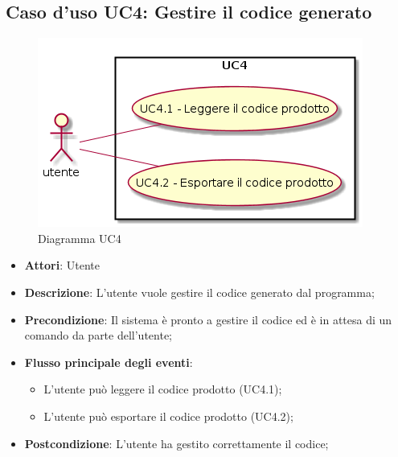 \documentclass[../AnalisiDeiRequisiti.tex]{subfiles}
\begin{document}

					\subsection{Caso d'uso UC4: Gestire il codice generato}
					\begin{figure} [H]
						\centering
						\includegraphics[scale=0.45]{./Figures/UC4.png}
						\caption{Diagramma UC4}\label{}
					\end{figure}
					\begin{itemize}
						\item \textbf{Attori}: Utente
						\item \textbf{Descrizione}: L'utente vuole gestire il codice generato dal programma;
						\item \textbf{Precondizione}: Il sistema è pronto a gestire il codice ed è in attesa di un comando da parte dell'utente;
						\item \textbf{Flusso principale degli eventi}: \begin{itemize}
							\item L'utente può leggere il codice prodotto (UC4.1);
							\item L'utente può esportare il codice prodotto (UC4.2);
						\end{itemize}
						\item \textbf{Postcondizione}: L'utente ha gestito correttamente il codice;
					\end{itemize}
\end{document}
